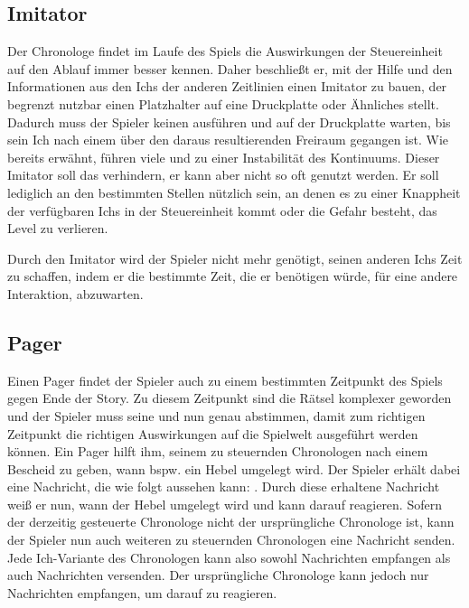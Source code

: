 \subsection{Imitator}\label{sec:concept_imitator}
Der Chronologe findet im Laufe des Spiels die Auswirkungen der Steuereinheit auf den Ablauf immer besser kennen. Daher beschließt er, mit der Hilfe und den Informationen aus den Ichs der anderen Zeitlinien einen Imitator zu bauen, der begrenzt nutzbar einen Platzhalter auf eine Druckplatte oder Ähnliches stellt. Dadurch muss der Spieler keinen  ausführen und auf der Druckplatte warten, bis sein Ich nach einem  über den daraus resultierenden Freiraum gegangen ist. Wie bereits erwähnt, führen viele  und  zu einer Instabilität des Kontinuums. Dieser Imitator soll das verhindern, er kann aber nicht so oft genutzt werden. Er soll lediglich an den bestimmten Stellen nützlich sein, an denen es zu einer Knappheit der verfügbaren Ichs in der Steuereinheit kommt oder die Gefahr besteht, das Level zu verlieren. 

Durch den Imitator wird der Spieler nicht mehr genötigt, seinen anderen Ichs Zeit zu schaffen, indem er die bestimmte Zeit, die er benötigen würde, für eine andere Interaktion, abzuwarten.
\subsection{Pager}
Einen Pager findet der Spieler auch zu einem bestimmten Zeitpunkt des Spiels gegen Ende der Story. Zu diesem Zeitpunkt sind die Rätsel komplexer geworden und der Spieler muss seine  und  nun genau abstimmen, damit zum richtigen Zeitpunkt die richtigen Auswirkungen auf die Spielwelt ausgeführt werden können. Ein Pager hilft ihm, seinem zu steuernden Chronologen nach einem  Bescheid zu geben, wann bspw. ein Hebel umgelegt wird. Der Spieler erhält dabei eine Nachricht, die wie folgt aussehen kann: . Durch diese erhaltene Nachricht weiß er nun, wann der Hebel umgelegt wird und kann darauf reagieren. Sofern der derzeitig gesteuerte Chronologe nicht der ursprüngliche Chronologe ist, kann der Spieler nun auch weiteren zu steuernden Chronologen eine Nachricht senden. Jede Ich-Variante des Chronologen kann also sowohl Nachrichten empfangen als auch Nachrichten versenden. Der ursprüngliche Chronologe kann jedoch nur Nachrichten empfangen, um darauf zu reagieren.

